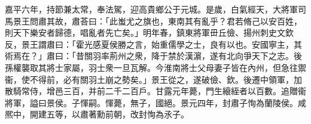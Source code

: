 \begin{pinyinscope}
嘉平六年，持節兼太常，奉法駕，迎高貴鄉公于元城。是歲，白氣經天，大將軍司馬景王問肅其故，肅荅曰：「此蚩尤之旗也，東南其有亂乎？君若脩己以安百姓，則天下樂安者歸德，唱亂者先亡矣。」明年春，鎮東將軍毌丘儉、揚州刺史文欽反，景王謂肅曰：「霍光感夏侯勝之言，始重儒學之士，良有以也。安國寧主，其術焉在？」肅曰：「昔關羽率荊州之衆，降于禁於漢濵，遂有北向爭天下之志。後孫權襲取其將士家屬，羽士衆一旦瓦解。今淮南將士父母妻子皆在內州，但急往禦衞，使不得前，必有關羽土崩之勢矣。」景王從之，遂破儉、欽。後遷中領軍，加散騎常侍，增邑三百，并前二千二百戶。甘露元年薨，門生縗絰者以百數。追贈衞將軍，謚曰景侯。子惲嗣。惲薨，無子，國絕。景元四年，封肅子恂為蘭陵侯。咸熈中，開建五等，以肅著勳前朝，改封恂為氶子。



\end{pinyinscope}
